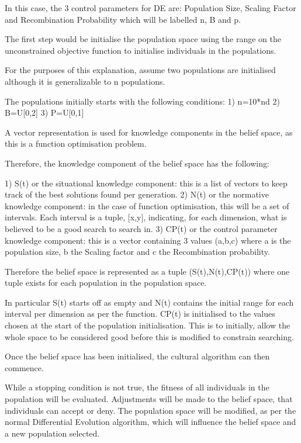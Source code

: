 \documentclass[12pt]{article}
\begin{document}
In this case, the 3 control parameters for DE are: Population Size, Scaling Factor and Recombination Probability which will be labelled n, B and p.

The first step would be initialise the population space using the range on the unconstrained objective function to initialise individuals in the populations.

For the purposes of this explanation, assume two populations are initialised although it is generalizable to n populations.

The populations initially starts with the following conditions:
	1) n=10*nd
	2) B=U[0,2]
	3) P=U[0,1]

A vector representation is used for knowledge components in the belief space, as this is a function optimisation problem.	

Therefore, the knowledge component of the belief space has the following:

	1) S(t) or the situational knowledge component: this is a list of vectors to keep track of the best solutions found per generation.
	2) N(t) or the normative knowledge component: in the case of function optimisation, this will be a set of intervals. Each interval is a tuple, {[x,y]}, indicating, for each dimension, what is believed to be a good search to search in.
	3) CP(t) or the control parameter knowledge component: this is a vector containing 3 values (a,b,c) where a is the population size, b the Scaling factor and c the Recombination probability.

Therefore the belief space is represented as a tuple (S(t),N(t),CP(t)) where one tuple exists for each population in the population space.

In particular S(t) starts off as empty and N(t) contains the initial range  for each interval per dimension as per the function. CP(t) is initialised to the values chosen at the start of the population initialisation. This is to initially, allow the whole space to be considered good before this is modified to constrain searching.

Once the belief space has been initialised, the cultural algorithm can then commence.

While a stopping condition is not true, the fitness of all individuals in the population will be evaluated. Adjustments will be made to the belief space, that individuals can accept or deny. The population space will be modified, as per the normal Differential Evolution algorithm, which will influence the belief space and a new population selected. 
\end{document}
